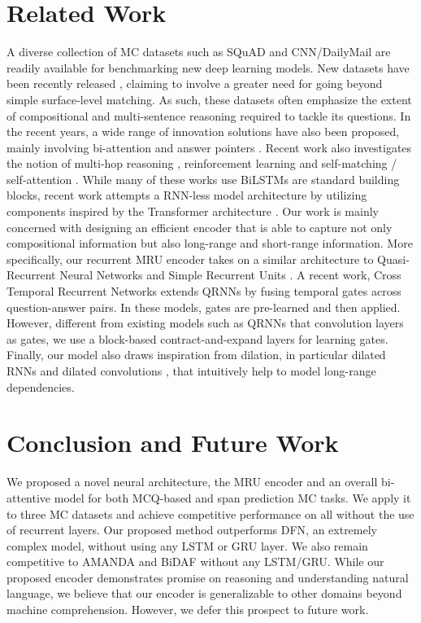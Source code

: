 \documentclass{article}
\begin{document}
\section{Related Work}
A diverse collection of MC datasets such as SQuAD \cite{rajpurkar2016squad} and CNN/DailyMail \cite{hermann2015teaching} are readily available for benchmarking new deep learning models. New datasets have been recently released \cite{kovcisky2017narrativeqa,joshi2017triviaqa,lai2017race,welbl2017constructing}, claiming to involve a greater need for going beyond simple surface-level matching. As such, these datasets often emphasize the extent of compositional and multi-sentence reasoning required to tackle its questions. In the recent years, a wide range of innovation solutions have also been proposed, mainly involving bi-attention \cite{seo2016bidirectional,DBLP:journals/corr/XiongZS16,cui2016attention} and answer pointers \cite{wang2016machine}. Recent work also investigates the notion of multi-hop reasoning \cite{dhingra2016gated,shen2017reasonet,xu2017towards}, reinforcement learning \cite{shen2017reasonet,wang2017r,hu2017mnemonic} and self-matching / self-attention \cite{kundu2018amanda,wang2017gated}. While many of these works use BiLSTMs are standard building blocks, recent work \cite{wei2018fast} attempts a RNN-less model architecture by utilizing components inspired by the Transformer architecture \cite{vaswani2017attention}. Our work is mainly concerned with designing an efficient encoder that is able to capture not only compositional information but also long-range and short-range information. More specifically, our recurrent MRU encoder takes on a similar architecture to Quasi-Recurrent Neural Networks \cite{DBLP:journals/corr/BradburyMXS16} and Simple Recurrent Units \cite{lei2017training}. A recent work, Cross Temporal Recurrent Networks \cite{tay2017cross} extends QRNNs by fusing temporal gates across question-answer pairs. In these models, gates are pre-learned and then applied. However, different from existing models such as QRNNs that convolution layers as gates, we use a block-based contract-and-expand layers for learning gates. Finally, our model also draws inspiration from dilation, in particular dilated RNNs \cite{chang2017dilated} and dilated convolutions \cite{kalchbrenner2016neural}, that intuitively help to model long-range dependencies. 

 \section{Conclusion and Future Work}
We proposed a novel neural architecture, the \textsc{MRU} encoder and an overall bi-attentive model for both MCQ-based and span prediction MC tasks. We apply
it to three MC datasets and achieve competitive performance on all without the use of recurrent layers.
Our proposed method outperforms DFN, an extremely complex model, without using any LSTM or GRU layer. We also remain competitive to AMANDA and BiDAF without any LSTM/GRU. While our proposed encoder
demonstrates promise on reasoning and understanding natural language, we believe that our encoder is generalizable to other domains beyond machine comprehension. However, we defer this prospect to future work. 


\end{document}
